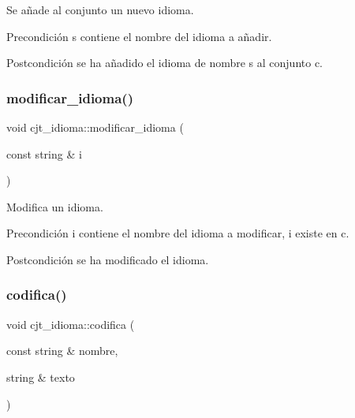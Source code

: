 Se añade al conjunto un nuevo idioma. 

\begin{DoxyPrecond}{Precondición}
s contiene el nombre del idioma a añadir. 
\end{DoxyPrecond}
\begin{DoxyPostcond}{Postcondición}
se ha añadido el idioma de nombre s al conjunto c. 
\end{DoxyPostcond}
\mbox{\label{classcjt__idioma_ac9cdce411a32c42a9fc7da848f7de4c0}} 
\subsubsection{\texorpdfstring{modificar\+\_\+idioma()}{modificar\_idioma()}}
{\footnotesize\ttfamily void cjt\+\_\+idioma\+::modificar\+\_\+idioma (\begin{DoxyParamCaption}\item[{const string \&}]{i }\end{DoxyParamCaption})}



Modifica un idioma. 

\begin{DoxyPrecond}{Precondición}
i contiene el nombre del idioma a modificar, i existe en c. 
\end{DoxyPrecond}
\begin{DoxyPostcond}{Postcondición}
se ha modificado el idioma. 
\end{DoxyPostcond}
\mbox{\label{classcjt__idioma_a5a92374dcbb5b9a0af7fdfccb59bc423}} 
\subsubsection{\texorpdfstring{codifica()}{codifica()}}
{\footnotesize\ttfamily void cjt\+\_\+idioma\+::codifica (\begin{DoxyParamCaption}\item[{const string \&}]{nombre,  }\item[{string \&}]{texto }\end{DoxyParamCaption})}



